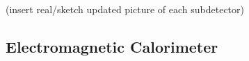 (insert real/sketch updated picture of each subdetector)

\subsection{Electromagnetic Calorimeter}


